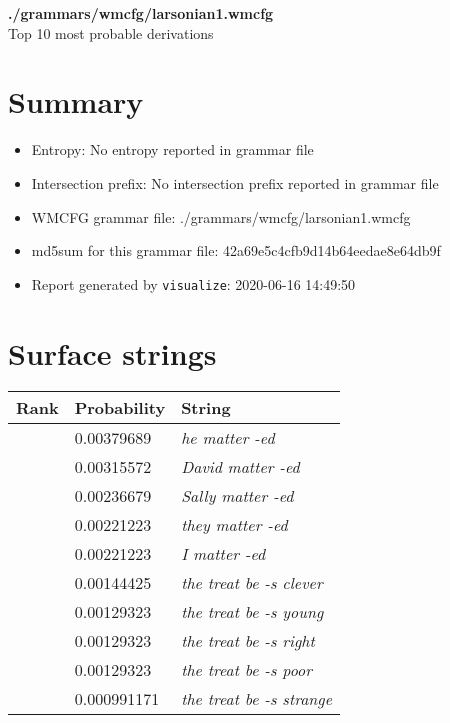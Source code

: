 \documentclass[11pt]{article}
\begin{document}
\begin{center}
{\huge \textbf{./grammars/wmcfg/larsonian1.wmcfg}} \\[0.5em]
{\normalsize Top 10 most probable derivations}
\end{center}

\section{Summary}
\begin{itemize}
	\item Entropy: No entropy reported in grammar file
	\item Intersection prefix: No intersection prefix reported in grammar file
	\item WMCFG grammar file: ./grammars/wmcfg/larsonian1.wmcfg
	\item md5sum for this grammar file: 42a69e5c4cfb9d14b64eedae8e64db9f
	\item Report generated by \texttt{visualize}: 2020-06-16 14:49:50
\end{itemize}

\section{Surface strings}
\hspace{1em}
\renewcommand{\arraystretch}{1.15}
\newcommand\rownumber{\stepcounter{rownumber}\arabic{rownumber}}
\begin{tabular}{l l l}
	\hline
	 Rank & Probability & String \\
	\hline
\rownumber & 0.00379689 & \textit{he matter -ed} \\
\rownumber & 0.00315572 & \textit{David matter -ed} \\
\rownumber & 0.00236679 & \textit{Sally matter -ed} \\
\rownumber & 0.00221223 & \textit{they matter -ed} \\
\rownumber & 0.00221223 & \textit{I matter -ed} \\
\rownumber & 0.00144425 & \textit{the treat be -s clever} \\
\rownumber & 0.00129323 & \textit{the treat be -s young} \\
\rownumber & 0.00129323 & \textit{the treat be -s right} \\
\rownumber & 0.00129323 & \textit{the treat be -s poor} \\
\rownumber & 0.000991171 & \textit{the treat be -s strange} \\
	\hline
\end{tabular}
\pagebreak
\end{document}

